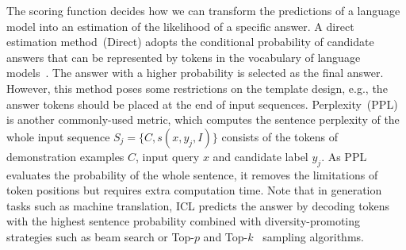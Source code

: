 
\begin{table}[t!]
    \centering
    \caption{Summary of different scoring functions. }
    \label{tab:score_func}
\end{table}
The scoring function decides how we can transform the predictions of a language model into an estimation of the likelihood of a specific answer.
A direct estimation method~(Direct) adopts the conditional probability of candidate answers that can be represented by tokens in the vocabulary of language models~\citep{gpt3}. The answer with a higher probability is selected as the final answer. However, this method poses some restrictions on the template design, e.g., the answer tokens should be placed at the end of input sequences.
Perplexity~(PPL) is another commonly-used metric, which computes the sentence perplexity of the whole input sequence $S_j = \{ C, s(x, y_j, I)\}$ consists of the tokens of demonstration examples $C$, input query $x$ and candidate label $y_j$. 
As PPL evaluates the probability of the whole sentence, it removes the limitations of token positions but requires extra computation time. 
Note that in generation tasks such as machine translation, ICL predicts the answer by decoding tokens with the highest sentence probability combined with diversity-promoting strategies such as beam search or Top-$p$ and Top-$k$~\citep{topp_sample} sampling algorithms.


